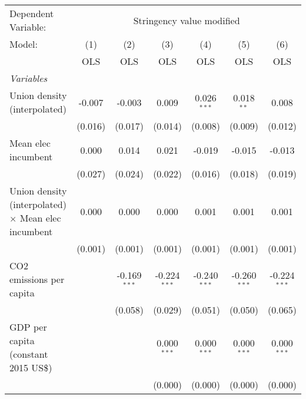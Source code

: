 
\begingroup
\centering
\begin{tabular}{lcccccc}
   \toprule
   Dependent Variable: & \multicolumn{6}{c}{Stringency value modified}\\
   Model:                                                     & (1)     & (2)            & (3)            & (4)            & (5)            & (6)\\  
                                                              &  OLS    & OLS            & OLS            & OLS            & OLS            & OLS\\  
   \midrule
   \emph{Variables}\\
   Union density (interpolated)                               & -0.007  & -0.003         & 0.009          & 0.026$^{***}$  & 0.018$^{**}$   & 0.008\\   
                                                              & (0.016) & (0.017)        & (0.014)        & (0.008)        & (0.009)        & (0.012)\\   
   Mean elec incumbent                                        & 0.000   & 0.014          & 0.021          & -0.019         & -0.015         & -0.013\\   
                                                              & (0.027) & (0.024)        & (0.022)        & (0.016)        & (0.018)        & (0.019)\\   
   Union density (interpolated) $\times$ Mean elec incumbent  & 0.000   & 0.000          & 0.000          & 0.001          & 0.001          & 0.001\\   
                                                              & (0.001) & (0.001)        & (0.001)        & (0.001)        & (0.001)        & (0.001)\\   
   CO2 emissions per capita                                   &         & -0.169$^{***}$ & -0.224$^{***}$ & -0.240$^{***}$ & -0.260$^{***}$ & -0.224$^{***}$\\   
                                                              &         & (0.058)        & (0.029)        & (0.051)        & (0.050)        & (0.065)\\   
   GDP per capita (constant 2015 US\$)                        &         &                & 0.000$^{***}$  & 0.000$^{***}$  & 0.000$^{***}$  & 0.000$^{***}$\\   
                                                              &         &                & (0.000)        & (0.000)        & (0.000)        & (0.000)\\   

\end{tabular}
